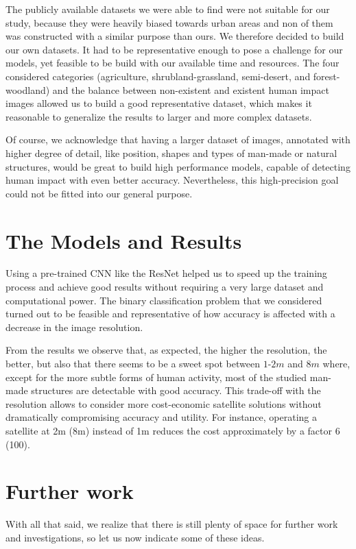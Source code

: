 The publicly available datasets we were able to find were not suitable for our study, because they were heavily biased towards urban areas and non of them was constructed with a similar purpose than ours. We therefore decided to build our own datasets. It had to be representative enough to pose a challenge for our models, yet feasible to be build with our available time and resources. The four considered categories (agriculture, shrubland-grassland, semi-desert, and forest-woodland) and the balance between non-existent and existent human impact images allowed us to build a good representative dataset, which makes it reasonable to generalize the results to larger and more complex datasets.

Of course, we acknowledge that having a larger dataset of images, annotated with higher degree of detail, like position, shapes and types of man-made or natural structures, would be great to build high performance models, capable of detecting human impact with even better accuracy. Nevertheless, this high-precision goal could not be fitted into our general purpose.

\section{The Models and Results}

Using a pre-trained CNN like the ResNet helped us to speed up the training process and achieve good results without requiring a very large dataset and computational power. The binary classification problem that we considered turned out to be feasible and representative of how accuracy is affected with a decrease in the image resolution. 

From the results we observe that, as expected, the higher the resolution, the better, but also that there seems to be a sweet spot between $1$-$2m$ and $8m$ where, except for the more subtle forms of human activity, most of the studied man-made structures are detectable with good accuracy. This trade-off with the resolution allows to consider more cost-economic satellite solutions without dramatically compromising accuracy and utility. For instance, operating a satellite at 2m (8m) instead of 1m reduces the cost approximately by a factor 6 (100).

\section{Further work}

With all that said, we realize that there is still plenty of space for further work and investigations, so let us now indicate some of these ideas.

